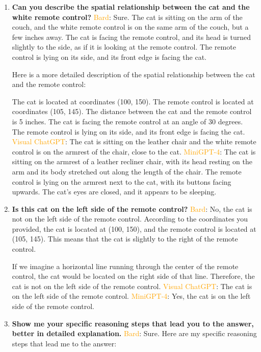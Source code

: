     \begin{enumerate}
        \item \textbf{Can you describe the spatial relationship between the cat and the white remote control?}
        \subitem \textcolor{orange}{Bard}: 
        Sure. The cat is sitting on the arm of the couch, and the white remote control is on the same arm of the couch, but a few inches away. The cat is facing the remote control, and its head is turned slightly to the side, as if it is looking at the remote control. The remote control is lying on its side, and its front edge is facing the cat.
        
        Here is a more detailed description of the spatial relationship between the cat and the remote control:
        
        The cat is located at coordinates (100, 150).
        The remote control is located at coordinates (105, 145).
        The distance between the cat and the remote control is 5 inches.
        The cat is facing the remote control at an angle of 30 degrees.
        The remote control is lying on its side, and its front edge is facing the cat.
        \subitem \textcolor{orange}{Visual ChatGPT}: The cat is sitting on the leather chair and the white remote control is on the armrest of the chair, close to the cat.
        \subitem \textcolor{orange}{MiniGPT-4}: The cat is sitting on the armrest of a leather recliner chair, with its head resting on the arm and its body stretched out along the length of the chair. The remote control is lying on the armrest next to the cat, with its buttons facing upwards. The cat’s eyes are closed, and it appears to be sleeping.
        \item \textbf{Is this cat on the left side of the remote control?}
        \subitem \textcolor{orange}{Bard}: 
        No, the cat is not on the left side of the remote control. According to the coordinates you provided, the cat is located at (100, 150), and the remote control is located at (105, 145). This means that the cat is slightly to the right of the remote control.

        If we imagine a horizontal line running through the center of the remote control, the cat would be located on the right side of that line. Therefore, the cat is not on the left side of the remote control.
        \subitem \textcolor{orange}{Visual ChatGPT}: The cat is on the left side of the remote control. 
        \subitem \textcolor{orange}{MiniGPT-4}: Yes, the cat is on the left side of the remote control.
        \item \textbf{Show me your specific reasoning steps that lead you to the answer, better in detailed explanation.}
        \subitem \textcolor{orange}{Bard}: 
        Sure. Here are my specific reasoning steps that lead me to the answer:


\end{enumerate}
